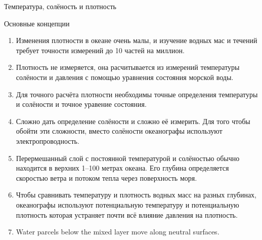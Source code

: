 \begin{chapter}{Температура, солёность и плотность}
\begin{section}{Основные концепции}
\begin{enumerate}
\item
Изменения плотности в океане очень малы, и изучение водных мас и
течений требует точности измерений до 10 частей на миллион.
%

\item
Плотность не измеряется, она расчитывается из измерений температуры
солёности и давления с помощью уравнения состояния морской воды.
%


\item
Для точного расчёта плотности необходимы точные определения
температуры и солёности и точное уравение состояния.
%

\item
Сложно дать определение солёности и сложно её измерить. Для того чтобы
обойти эти сложности, вместо солёности океанографы используют
электропроводность.
%

\item
Перермешанный слой с постоянной температурой и солёностью обычно
находится в верхних 1--100 метрах океана. Его глубина определяется
скоростью ветра и потоком тепла через поверхность моря.
%

\item
Чтобы сравнивать температуру и плотность водных масс на разных
глубинах, океанографы используют потенциальную температуру и
потенциальную плотность которая устраняет почти всё влияние давления
на плотность.
%

\item 
Water parcels below the mixed layer move along
neutral surfaces.


\end{enumerate}
\end{section}
\end{chapter}
